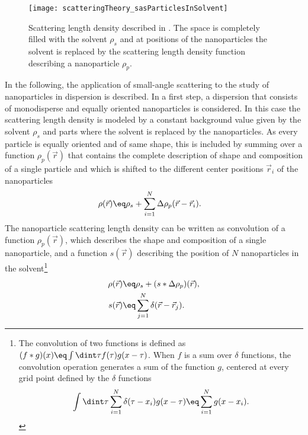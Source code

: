 \documentclass[\main/dresen_thesis.tex]{subfiles}
\begin{document}
    \begin{figure}[tb]
      \centering
      \texttt{[image: scatteringTheory\_sasParticlesInSolvent]}
      \caption{\label{fig:theoreticalBackground:scattering:scatteringTheory:sasParticlesInSolvent}Scattering length density described in . The space is completely filled with the solvent $\rho_s$ and at positions of the nanoparticles the solvent is replaced by the scattering length density function describing a nanoparticle $\rho_p$.}
    \end{figure}
    In the following, the application of small-angle scattering to the study of nanoparticles in dispersion is described.
    In a first step, a dispersion that consists of monodisperse and equally oriented nanoparticles is considered.
    In this case the scattering length density is modeled by a constant background value given by the solvent $\rho_s$ and parts where the solvent is replaced by the nanoparticles.
    As every particle is equally oriented and of same shape, this is included by summing over a function $\rho_p (\vec{r})$ that contains the complete description of shape and composition of a single particle and which is shifted to the different center positions $\vec{r}_i$ of the nanoparticles
    \begin{align}
      \rho(\vec{r}) \eq& \rho_s + \sum_{i=1}^N \Delta \rho_{p}(\vec{r} - \vec{r}_i).\label{eq:theoreticalBackground:scattering:scatteringTheory:sasParticlesInSolvent}
    \end{align}
    The nanoparticle scattering length density can be written as convolution of a function $\rho_{p}(\vec{r})$, which describes the shape and composition of a single nanoparticle, and a function $s(\vec{r})$ describing the position of $N$ nanoparticles in the solvent\footnote{The convolution of two functions is defined as $(f*g)(x) \eq \int \dint \tau f(\tau) g(x-\tau)$.
    When $f$ is a sum over $\delta$ functions, the convolution operation generates a sum of the function $g$, centered at every grid point defined by the $\delta$ functions
    \begin{equation}
      \int \dint \tau \sum_{i=1}^N \delta(\tau - x_i) g(x-\tau) \eq \sum_{i=1}^N g(x - x_i).
    \end{equation}}
    \begin{align}
      \rho(\vec{r}) \eq& \rho_s + (s * \Delta \rho_{p})(\vec{r}),\\
      s(\vec{r}) \eq& \sum_{j=1}^N \delta(\vec{r} - \vec{r}_j).
    \end{align}
\end{document}
